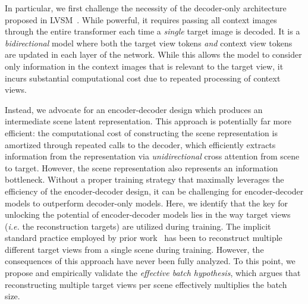 In particular, we first challenge the necessity of the decoder-only architecture proposed in LVSM~\citep{jin2024lvsm}. While powerful, it requires passing all context images through the entire transformer each time a \textit{single} target image is decoded. It is a \emph{bidirectional} model where both the target view tokens \emph{and} context view tokens are updated in each layer of the network. While this allows the model to consider only information in the context images that is relevant to the target view, it incurs substantial computational cost due to repeated processing of context views.

Instead, we advocate for an encoder-decoder design which produces an intermediate scene latent representation. This approach is potentially far more efficient: the computational cost of constructing the scene representation is amortized through repeated calls to the decoder, which efficiently extracts information from the representation via \emph{unidirectional} cross attention from scene to target.  However, the scene representation also represents an information bottleneck. Without a proper training strategy that maximally leverages the efficiency of the encoder-decoder design, it can be challenging for encoder-decoder models to outperform decoder-only models. Here, we identify that the key for unlocking the potential of encoder-decoder models lies in the way target views (\emph{i.e.} the reconstruction targets) are utilized during training. The implicit standard practice employed by prior work~\citep{charatan2024pixelsplat, jin2024lvsm, sajjadi2022scene, zhang2024gs} has been to reconstruct multiple different target views from a single scene during training. However, the consequences of this approach have never been fully analyzed. To this point, we propose and empirically validate the \emph{effective batch hypothesis}, which argues that reconstructing multiple target views per scene effectively multiplies the batch size.  





